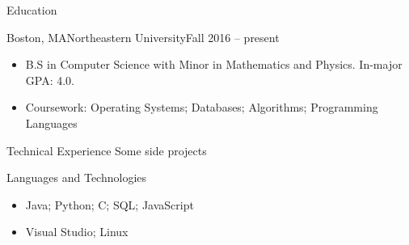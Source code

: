 \documentclass[]{mcdowellcv}
\begin{document}
	\begin{cvsection}{Education}
		\begin{cvsubsection}{Boston, MA}{Northeastern University}{Fall 2016 -- present}
			\begin{itemize}
				\item B.S in Computer Science with Minor in Mathematics and Physics.  In-major GPA: 4.0.
				\item Coursework: Operating Systems; Databases; Algorithms; Programming Languages
			\end{itemize}
		\end{cvsubsection}
	\end{cvsection}

	\begin{cvsection}{Technical Experience}
	  Some side projects
	\end{cvsection}

	\begin{cvsection}{Languages and Technologies}
		\begin{cvsubsection}{}{}{}
			\begin{itemize}
				\item Java; Python; C; SQL; JavaScript
				\item Visual Studio; Linux
			\end{itemize}
		\end{cvsubsection}
	\end{cvsection}
\end{document}
